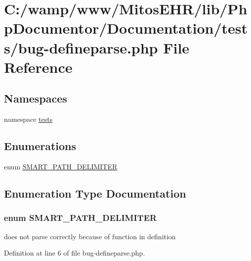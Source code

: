 \hypertarget{bug-defineparse_8php}{\section{\-C\-:/wamp/www/\-Mitos\-E\-H\-R/lib/\-Php\-Documentor/\-Documentation/tests/bug-\/defineparse.php \-File \-Reference}
\label{bug-defineparse_8php}
}
\subsection*{\-Namespaces}
\begin{DoxyCompactItemize}
\item 
namespace \hyperlink{namespacetests}{tests}
\end{DoxyCompactItemize}
\subsection*{\-Enumerations}
\begin{DoxyCompactItemize}
\item 
enum \hyperlink{bug-defineparse_8php_a13d5bcacf9cc5512cda2071eac306d66}{\-S\-M\-A\-R\-T\-\_\-\-P\-A\-T\-H\-\_\-\-D\-E\-L\-I\-M\-I\-T\-E\-R} 
\end{DoxyCompactItemize}


\subsection{\-Enumeration \-Type \-Documentation}
\hypertarget{bug-defineparse_8php_a13d5bcacf9cc5512cda2071eac306d66}{
\subsubsection[{\-S\-M\-A\-R\-T\-\_\-\-P\-A\-T\-H\-\_\-\-D\-E\-L\-I\-M\-I\-T\-E\-R}]{\setlength{\rightskip}{0pt plus 5cm}enum {\bf \-S\-M\-A\-R\-T\-\_\-\-P\-A\-T\-H\-\_\-\-D\-E\-L\-I\-M\-I\-T\-E\-R}}}\label{bug-defineparse_8php_a13d5bcacf9cc5512cda2071eac306d66}
does not parse correctly because of function in definition 

\-Definition at line 6 of file bug-\/defineparse.\-php.

